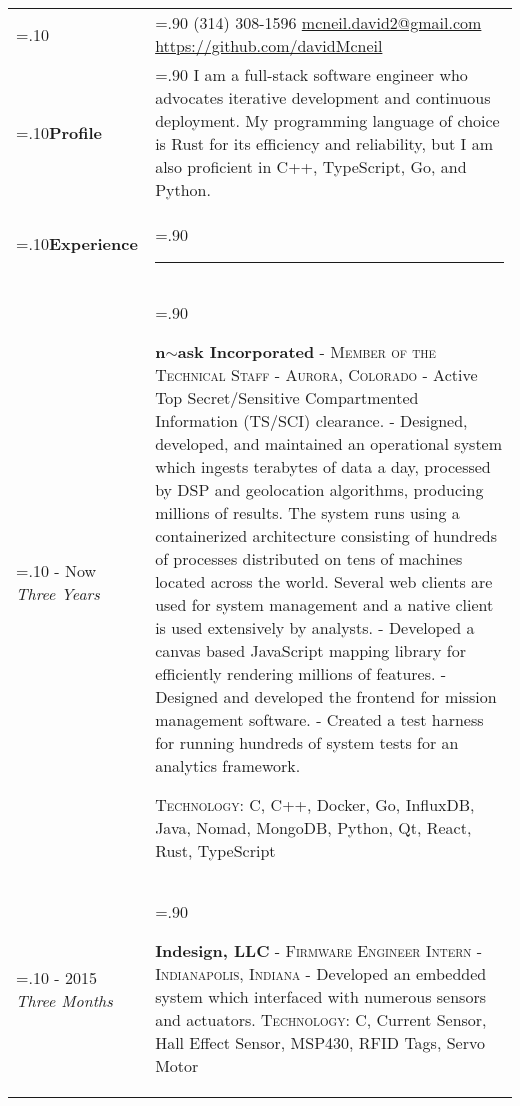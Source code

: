 \documentclass[10pt]{article}
\newcommand{\timeFrame}[3] {
  \if\relax\detokenize{#2}\relax
    #1
  \else
    #1 - #2
  \fi
  \newline
  \scriptsize \textit{#3}
}
\newcommand{\entry}[5] {
  \textbf{#1}
  \if\relax\detokenize{#2}\relax
  \else
       - \textsc{#2}
  \fi
  \if\relax\detokenize{#3}\relax
  \else
      - \textsc{#3}
  \fi
  \newline #4
  \if\relax\detokenize{#5}\relax
  \else
      \newline \textsc{Technology:} #5
  \fi
  \\
}
\newcommand{\horizontalLine}[0] {
    \noindent\rule{.90\linewidth}{0.4pt}
}
\begin{document}

\begin{tabularx}{\linewidth}{>{\hsize=.10\hsize}X>{\hsize=.90\hsize}X}

{\bfseries\large David McNeil} &
(314) 308-1596\newline
{\href{mailto:mcneil.david2@gmail.com}{mcneil.david2@gmail.com}}\newline
\href{https://github.com/davidMcneil}{https://github.com/davidMcneil}\\[5pt]

\textbf{Profile} &
{I am a full-stack software engineer who advocates iterative development and continuous deployment. My programming language of choice is Rust for its efficiency and reliability, but I am also proficient in C++, TypeScript, Go, and Python.
} \\

\textbf{Experience} & \horizontalLine \\

\timeFrame{2016}{Now}{Three Years} &
\entry{n$\sim$ask Incorporated}
  {Member of the Technical Staff}
  {Aurora, Colorado}
  {
  - Active Top Secret/Sensitive Compartmented Information (TS/SCI) clearance. \newline
  - Designed, developed, and maintained an operational system which ingests terabytes of data a day, processed by DSP and geolocation algorithms, producing millions of results. The system runs using a containerized architecture consisting of hundreds of processes distributed on tens of machines located across the world. Several web clients are used for system management and a native client is used extensively by analysts. \newline
  - Developed a canvas based JavaScript mapping library for efficiently rendering millions of features. \newline
  - Designed and developed the frontend for mission management software. \newline
  - Created a test harness for running hundreds of system tests for an analytics framework.
  }
  {C, C++, Docker, Go, InfluxDB, Java, Nomad, MongoDB, Python, Qt, React, Rust, TypeScript}

\timeFrame{2014}{2015}{Three Months} &
\entry{Indesign, LLC}
  {Firmware Engineer Intern}
  {Indianapolis, Indiana}
  {- Developed an embedded system which interfaced with numerous sensors and actuators.}
  {C, Current Sensor, Hall Effect Sensor, MSP430, RFID Tags, Servo Motor}


\end{tabularx}
\end{document}
